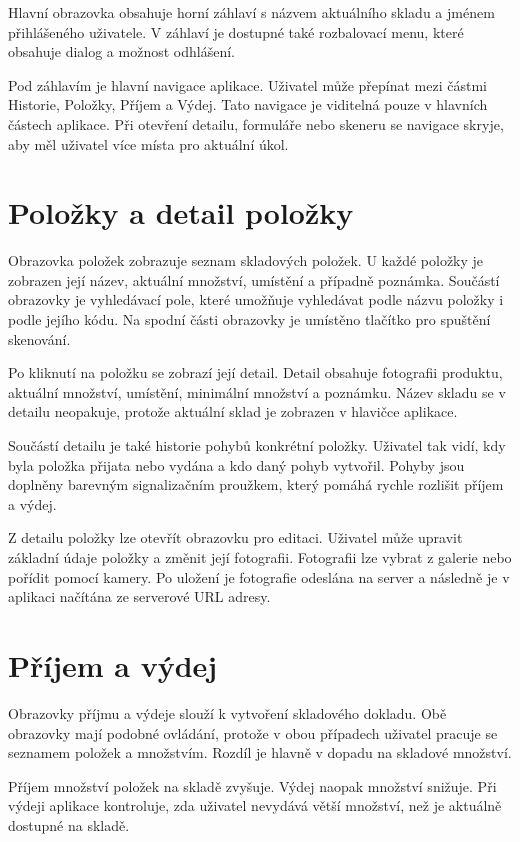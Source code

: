 \documentclass[czech, oth, kiv, he, pdf, viewonly]{fasthesis}
\begin{document}
Hlavní obrazovka obsahuje horní záhlaví s názvem aktuálního skladu
a jménem přihlášeného uživatele. V záhlaví je dostupné také rozbalovací
menu, které obsahuje dialog  a možnost odhlášení.

Pod záhlavím je hlavní navigace aplikace. Uživatel může přepínat mezi
částmi Historie, Položky, Příjem a Výdej. Tato navigace je viditelná
pouze v hlavních částech aplikace. Při otevření detailu, formuláře
nebo skeneru se navigace skryje, aby měl uživatel více místa pro
aktuální úkol.

\section{Položky a detail položky}

Obrazovka položek zobrazuje seznam skladových položek. U každé položky
je zobrazen její název, aktuální množství, umístění a případně
poznámka. Součástí obrazovky je vyhledávací pole, které umožňuje
vyhledávat podle názvu položky i podle jejího kódu.
Na spodní části obrazovky je umístěno tlačítko pro spuštění skenování.

Po kliknutí na položku se zobrazí její detail. Detail obsahuje
fotografii produktu, aktuální množství, umístění, minimální množství
a poznámku. Název skladu se v detailu neopakuje, protože aktuální sklad
je zobrazen v hlavičce aplikace.

Součástí detailu je také historie pohybů konkrétní položky. Uživatel
tak vidí, kdy byla položka přijata nebo vydána a kdo daný pohyb
vytvořil. Pohyby jsou doplněny barevným signalizačním proužkem, který
pomáhá rychle rozlišit příjem a výdej.

Z detailu položky lze otevřít obrazovku pro editaci. Uživatel může
upravit základní údaje položky a změnit její fotografii. Fotografii
lze vybrat z galerie nebo pořídit pomocí kamery. Po uložení je
fotografie odeslána na server a následně je v aplikaci načítána ze
serverové URL adresy.

\section{Příjem a výdej}

Obrazovky příjmu a výdeje slouží k vytvoření skladového dokladu.
Obě obrazovky mají podobné ovládání, protože v obou případech uživatel
pracuje se seznamem položek a množstvím. Rozdíl je hlavně v dopadu na
skladové množství.

Příjem množství položek na skladě zvyšuje. Výdej naopak množství
snižuje. Při výdeji aplikace kontroluje, zda uživatel nevydává větší
množství, než je aktuálně dostupné na skladě.
\end{document}
